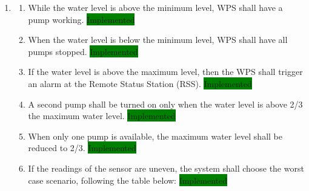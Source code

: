\documentclass[11pt]{article}
\begin{document}
\begin{enumerate}[leftmargin=4em, font=\small, label=\textbf{SR-\arabic*}]
	\setlength\itemsep{.5em}
	\item 

		\begin{enumerate}[leftmargin=1.5em, font=\small, label=\textbf{.\arabic*:}]
		\setlength\itemsep{0em}
		\item While the water level is above the minimum level, WPS shall have a pump working. \colorbox{green}{Implemented}
		\item When the water level is below the minimum level, WPS shall have all pumps stopped. \colorbox{green}{Implemented}
		\item If the water level is above the maximum level, then the WPS shall trigger an alarm at the Remote Status Station (RSS). \colorbox{green}{Implemented}
		\item A second pump shall be turned on only when the water level is above 2/3 the maximum water level. \colorbox{green}{Implemented}
		\item When only one pump is available, the maximum water level shall be reduced to 2/3. \colorbox{green}{Implemented}
		\item If the readings of the sensor are uneven, the system shall choose the worst case scenario, following the table below:  \colorbox{green}{Implemented}
		

\end{enumerate}
\end{enumerate}
\end{document}
